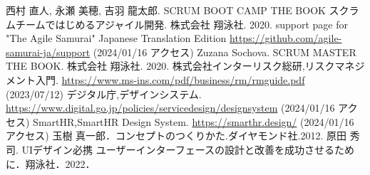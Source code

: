 \documentclass[openany,11pt,papersize,dvipdfm,draft]{jsbook}
\begin{document}
\begin{thebibliography}{3}
     西村 直人, 永瀬 美穂, 吉羽 龍太郎. SCRUM BOOT CAMP THE BOOK スクラムチームではじめるアジャイル開発. 株式会社 翔泳社. 2020.
     support page for "The Agile Samurai" Japanese Translation Edition \url{https://github.com/agile-samurai-ja/support} (2024/01/16 アクセス)
     Zuzana Sochova. SCRUM MASTER THE BOOK. 株式会社 翔泳社. 2020.
     株式会社インターリスク総研,リスクマネジメント入門. \url{https://www.ms-ins.com/pdf/business/rm/rmguide.pdf} (2023/07/12)
     デジタル庁,デザインシステム. \url{https://www.digital.go.jp/policies/servicedesign/designsystem} (2024/01/16 アクセス)
     SmartHR,SmartHR Design System. \url{https://smarthr.design/} (2024/01/16 アクセス)
     玉樹 真一郎．コンセプトのつくりかた.ダイヤモンド社.2012.
     原田 秀司. UIデザイン必携 ユーザーインターフェースの設計と改善を成功させるために．翔泳社．2022．
\end{thebibliography}
\end{document}
